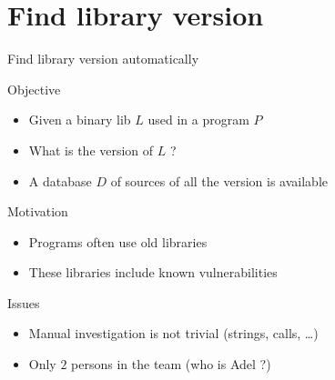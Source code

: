 \documentclass[11pt]{beamer}
\begin{document}
\section{Find library version}
\begin{frame}{Find library version automatically}

    \begin{block}{Objective}
        \begin{itemize}
            \item Given a binary lib $L$ used in a program $P$
            \item What is the version of $L$ ?
            \item A database $D$ of sources of all the version is available
        \end{itemize}
    \end{block}

    \begin{block}{Motivation}
        \begin{itemize}
            \item Programs often use old libraries
            \item These libraries include known vulnerabilities
        \end{itemize}
    \end{block}

    \begin{block}{Issues}
        \begin{itemize}
            \item Manual investigation is not trivial (strings, calls, \dots)
            \item Only $2$ persons in the team (who is Adel ?)
        \end{itemize}

    \end{block}

\end{frame}
\end{document}
